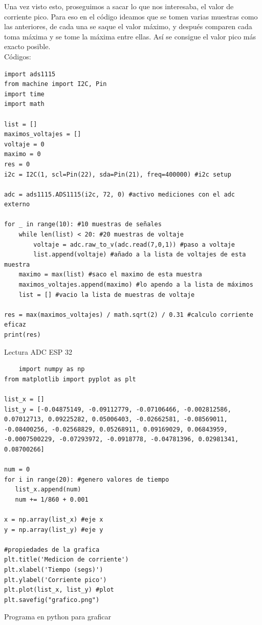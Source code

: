 Una vez visto esto, proseguimos a sacar lo que nos interesaba, el valor de corriente pico. Para eso en el código ideamos que se tomen varias muestras como las anteriores, de cada una se saque el valor máximo, y después comparen cada toma máxima y se tome la máxima entre ellas. Así se consigue el valor pico más exacto posible.\\

Códigos:\\

\begin{listing}[H]
\begin{verbatim}
import ads1115
from machine import I2C, Pin
import time
import math

list = []
maximos_voltajes = []
voltaje = 0
maximo = 0
res = 0
i2c = I2C(1, scl=Pin(22), sda=Pin(21), freq=400000) #i2c setup

adc = ads1115.ADS1115(i2c, 72, 0) #activo mediciones con el adc externo

for _ in range(10): #10 muestras de señales
    while len(list) < 20: #20 muestras de voltaje
        voltaje = adc.raw_to_v(adc.read(7,0,1)) #paso a voltaje
        list.append(voltaje) #añado a la lista de voltajes de esta muestra
    maximo = max(list) #saco el maximo de esta muestra
    maximos_voltajes.append(maximo) #lo apendo a la lista de máximos
    list = [] #vacio la lista de muestras de voltaje

res = max(maximos_voltajes) / math.sqrt(2) / 0.31 #calculo corriente eficaz
print(res)
\end{verbatim}
\caption{Lectura ADC ESP 32}
\label{ads1115 lectura 2}
\end{listing}

\begin{listing}[H]
\begin{verbatim}
    import numpy as np
from matplotlib import pyplot as plt

list_x = []
list_y = [-0.04875149, -0.09112779, -0.07106466, -0.002812586, 
0.07012713, 0.09225282, 0.05006403, -0.02662581, -0.08569011, 
-0.08400256, -0.02568829, 0.05268911, 0.09169029, 0.06843959, 
-0.0007500229, -0.07293972, -0.0918778, -0.04781396, 0.02981341, 
0.08700266]

num = 0
for i in range(20): #genero valores de tiempo
   list_x.append(num)
   num += 1/860 + 0.001

x = np.array(list_x) #eje x
y = np.array(list_y) #eje y

#propiedades de la grafica
plt.title('Medicion de corriente')
plt.xlabel('Tiempo (segs)')
plt.ylabel('Corriente pico')
plt.plot(list_x, list_y) #plot
plt.savefig("grafico.png")
\end{verbatim}
\caption{Programa en python para graficar}
\label{grafica en python}
\end{listing}


